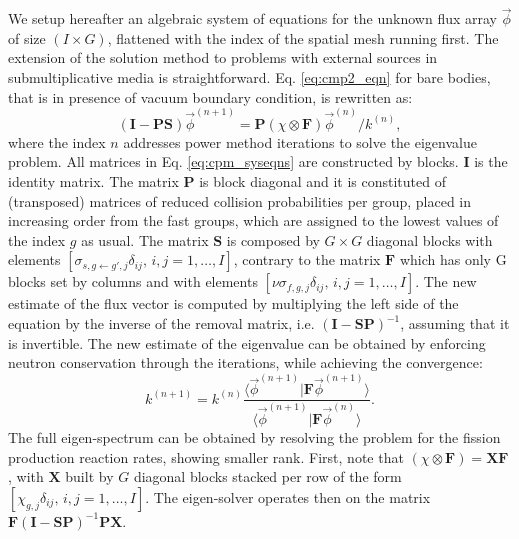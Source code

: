 \documentclass{ictt26}
\begin{document}
We setup hereafter an algebraic system of equations for the unknown flux array $\vec{\phi}$ of size $(I \times G)$, flattened with the index of the spatial mesh running first. The extension of the solution method to problems with external sources in submultiplicative media is straightforward. Eq. \ref{eq:cmp2_eqn} for bare bodies, that is in presence of vacuum boundary condition, is rewritten as:
\begin{equation}
\label{eq:cpm_syseqns}
(\mathbf{I} - \mathbf{P}\mathbf{S}) \vec{\phi}^{(n+1)} = \mathbf{P} (\chi \otimes \mathbf{F}) \vec{\phi}^{(n)} / k^{(n)},
\end{equation}
where the index $n$ addresses power method iterations to solve the eigenvalue problem. All matrices in Eq. \ref{eq:cpm_syseqns} are constructed by blocks. $\mathbf{I}$ is the identity matrix. The matrix $\mathbf{P}$ is block diagonal and it is constituted of (transposed) matrices of reduced collision probabilities per group, placed in increasing order from the fast groups, which are assigned to the lowest values of the index $g$ as usual. The matrix $\mathbf{S}$ is composed by $G \times G$ diagonal blocks with elements $[\sigma_{s, g \leftarrow g',j}\delta_{ij}, \, i, j=1, \ldots, I]$, contrary to the matrix $\mathbf{F}$ which has only G blocks set by columns and with elements $[\nu\sigma_{f, g, j}\delta_{ij}, \, i, j=1, \ldots, I]$. The new estimate of the flux vector is computed by multiplying the left side of the equation by the inverse of the removal matrix, i.e. $(\mathbf{I} - \mathbf{S} \mathbf{P})^{-1}$, assuming that it is invertible. The new estimate of the eigenvalue can be obtained by enforcing neutron conservation through the iterations, while achieving the convergence:
\[
  k^{(n+1)} = k^{(n)}
    \frac{\langle \vec{\phi}^{(n+1)} | \mathbf{F} \vec{\phi}^{(n+1)} \rangle}{\langle \vec{\phi}^{(n+1)} | \mathbf{F} \vec{\phi}^{(n)} \rangle}.
\]
The full eigen-spectrum can be obtained by resolving the problem for the fission production reaction rates, showing smaller rank. First, note that $(\chi \otimes \mathbf{F}) = \mathbf{X} \mathbf{F}$, with $\mathbf{X}$ built by $G$ diagonal blocks stacked per row of the form $[\chi_{g,j}\delta_{ij}, \, i, j=1, \ldots, I]$. The eigen-solver operates then on the matrix $\mathbf{F}(\mathbf{I} - \mathbf{S} \mathbf{P})^{-1} \mathbf{P} \mathbf{X}$.
\end{document}

